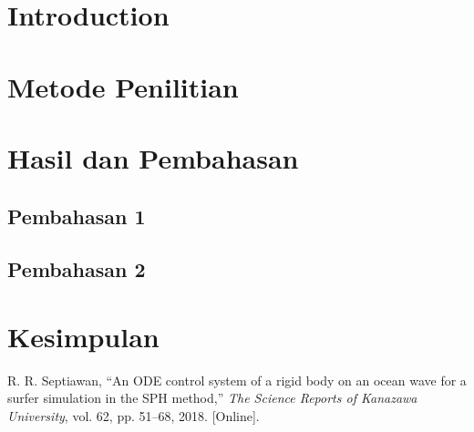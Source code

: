 \documentclass{article}
\begin{document}
\begin{multicols}{2}
\section{Introduction}
\blindtext
\cite{Septiawan1}

\section{Metode Penilitian}
\blindtext

\section{Hasil dan Pembahasan}
\blindtext

\subsection{Pembahasan 1}
\blindtext

\subsection{Pembahasan 2}
\blindtext

\section{Kesimpulan}
\blindtext


\begin{thebibliography}{1.7} 
	 R. R. Septiawan, “An ODE control system of a rigid body on an ocean wave for a surfer simulation in the SPH method,” \textit{The Science Reports of Kanazawa University}, vol. 62, pp. 51–68, 2018. [Online].
\end{thebibliography}
\end{multicols}
\end{document}
